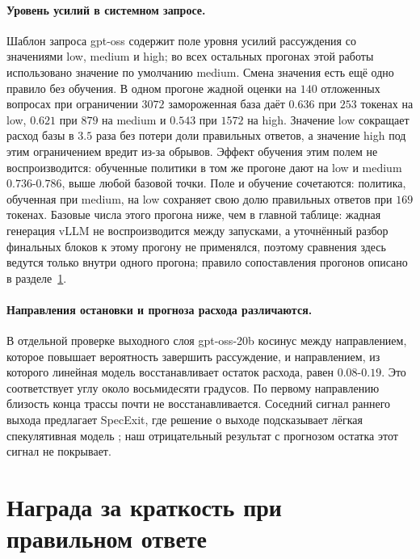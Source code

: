 \documentclass[11pt]{article}
\begin{document}
\paragraph{Уровень усилий в системном запросе.} Шаблон запроса gpt-oss содержит поле уровня усилий рассуждения со значениями low, medium и high; во всех остальных прогонах этой работы использовано значение по умолчанию medium. Смена значения есть ещё одно правило без обучения. В одном прогоне жадной оценки на $140$ отложенных вопросах при ограничении $3072$ замороженная база даёт $0.636$ при $253$ токенах на low, $0.621$ при $879$ на medium и $0.543$ при $1572$ на high. Значение low сокращает расход базы в $3.5$ раза без потери доли правильных ответов, а значение high под этим ограничением вредит из-за обрывов. Эффект обучения этим полем не воспроизводится: обученные политики в том же прогоне дают на low и medium $0.736$-$0.786$, выше любой базовой точки. Поле и обучение сочетаются: политика, обученная при medium, на low сохраняет свою долю правильных ответов при $169$ токенах. Базовые числа этого прогона ниже, чем в главной таблице: жадная генерация vLLM не воспроизводится между запусками, а уточнённый разбор финальных блоков к этому прогону не применялся, поэтому сравнения здесь ведутся только внутри одного прогона; правило сопоставления прогонов описано в разделе~\ref{sec:rl}.

\paragraph{Направления остановки и прогноза расхода различаются.} В отдельной проверке выходного слоя gpt-oss-20b косинус между направлением, которое повышает вероятность завершить рассуждение, и направлением, из которого линейная модель восстанавливает остаток расхода, равен $0.08$-$0.19$. Это соответствует углу около восьмидесяти градусов. По первому направлению близость конца трассы почти не восстанавливается. Соседний сигнал раннего выхода предлагает SpecExit, где решение о выходе подсказывает лёгкая спекулятивная модель \citep{yang2025specexit}; наш отрицательный результат с прогнозом остатка этот сигнал не покрывает.

\section{Награда за краткость при правильном ответе}
\label{sec:rl}
\end{document}
